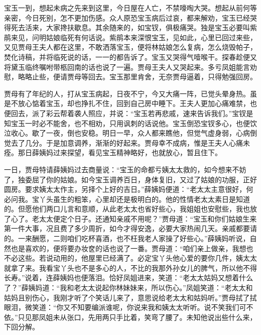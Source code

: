 \begin{parag}
    宝玉一到，想起未病之先来到这里，今日屋在人亡，不禁嚎啕大哭。想起从前何等亲密，今日死别，怎不更加伤感。众人原恐宝玉病后过哀，都来解劝，宝玉已经哭得死去活来，大家搀扶歇息。其余随来的，如宝钗，俱极痛哭。独是宝玉必要叫紫鹃来见，问明姑娘临死有何话说。紫鹃本来深恨宝玉，见如此，心里已回过来些，又见贾母王夫人都在这里，不敢洒落宝玉，便将林姑娘怎么复病，怎么烧毁帕子，焚化诗稿，并将临死说的话，一一的都告诉了。宝玉又哭得气噎喉干。探春趁便又将黛玉临终嘱咐带柩回南的话也说了一遍。贾母王夫人又哭起来。多亏凤姐能言劝慰，略略止些，便请贾母等回去。宝玉那里肯舍，无奈贾母逼着，只得勉强回房。
\end{parag}


\begin{parag}
    贾母有了年纪的人，打从宝玉病起，日夜不宁，今又大痛一阵，已觉头晕身热。虽是不放心惦着宝玉，却也挣扎不住，回到自己房中睡下。王夫人更加心痛难禁，也便回去，派了彩云帮着袭人照应，并说：“宝玉若再悲戚，速来告诉我们。”宝钗是知宝玉一时必不能舍，也不相劝，只用讽刺的话说他。宝玉倒恐宝钗多心，也便饮泣收心。歇了一夜，倒也安稳。明日一早，众人都来瞧他，但觉气虚身弱，心病倒觉去了几分。于是加意调养，渐渐的好起来。贾母幸不成病，惟是王夫人心痛未痊。那日薛姨妈过来探望，看见宝玉精神略好，也就放心，暂且住下。
\end{parag}


\begin{parag}
    一日，贾母特请薛姨妈过去商量说：“宝玉的命都亏姨太太救的，如今想来不妨了，独委屈了你的姑娘。如今宝玉调养百日，身体复旧，又过了姑娘的功服，正好圆房。要求姨太太作主，另择个上好的吉日。”薛姨妈便道：“老太太主意很好，何必问我。宝丫头虽生的粗笨，心里却还是极明白的。他的性情老太太素日是知道的。但愿他们两口儿言和意顺，从此老太太也省好些心，我姐姐也安慰些，我也放了心了。老太太便定个日子。还通知亲戚不用呢？”贾母道：“宝玉和你们姑娘生来第一件大事，况且费了多少周折，如今才得安逸，必要大家热闹几天。亲戚都要请的。一来酬愿，二则咱们吃杯喜酒，也不枉我老人家操了好些心。”薛姨妈听说，自然也是喜欢的，便将要办妆奁的话也说了一番。贾母道：“咱们亲上做亲，我想也不必这些。若说动用的，他屋里已经满了。必定宝丫头他心爱的要你几件，姨太太就拿了来。我看宝丫头也不是多心的人，不比的我那外孙女儿的脾气，所以他不得长寿。”说着，连薛姨妈也便落泪。恰好凤姐进来，笑道：“老太太姑妈又想着什么了？”薛姨妈道：“我和老太太说起你林妹妹来，所以伤心。”凤姐笑道：“老太太和姑妈且别伤心，我刚才听了个笑话儿来了，意思说给老太太和姑妈听。”贾母拭了拭眼泪，微笑道：“你又不知要编派谁呢，你说来我和姨太太听听。说不笑我们可不依。”只见那凤姐未从张口，先用两只手比着，笑弯了腰了。未知他说出些什么来，下回分解。
\end{parag}